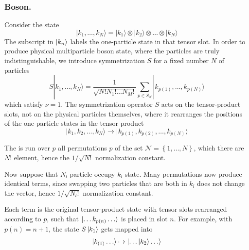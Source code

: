 \documentclass[../../../main.tex]{subfiles}
\begin{document}
\subsubsection{Boson.}
Consider the state
\begin{equation*}
  |k_1, \ldots, k_N\rangle = |k_1\rangle \otimes |k_2\rangle \otimes \ldots \otimes |k_N\rangle
\end{equation*}
The subscript in $\ket{k_n}$ labels the one-particle state in that tensor slot.
In order to produce physical multiparticle boson state, where the particles are truly indistinguishable, we introduce symmetrization $S$ for a fixed number $N$ of particles
\begin{equation*}
  S |k_1, \ldots, k_N \rangle =
  \frac{1}{\sqrt{N!N_1! \ldots N_M!}}
  \sum_{p \in S_N} |k_{p(1)}, \ldots, k_{p(N)} \rangle
\end{equation*}
which satisfy $\nu=1$.
The symmetrization operator  $S$ acts on the tensor-product slots, not on the physical particles themselves, where it rearranges the positions of the one-particle states in the tensor product
\begin{equation*}
  |k_1, k_2, \ldots, k_N\rangle \rightarrow |k_{p(1)}, k_{p(2)}, \ldots, k_{p(N)}\rangle
\end{equation*}

The is run over $p$ all permutations $p$ of the set $\mathcal{N}=\left\{ 1,\dots,N \right\} $, which there are $N!$ element, hence the $1/\sqrt{N!}$ normalization constant.

Now suppose that $N_l$ particle occupy $k_l$ state.
Many permutations now produce identical terms, since swapping two particles that are both in $k_l$  does not change the vector, hence $1/\sqrt{N_l!}$ normalization constant.

Each term is the original tensor-product state with tensor slots rearranged according to $p$, such that $\ket{\dots k_{p(n)}\dots}$ is placed in slot $n$.
For example, with $p(n)=n+1$, the state $S\ket{k_1}$ gets mapped into
\begin{equation*}
  \ket{k_{{(1)}}\dots} \mapsto \ket{\dots \ket{k_2}\dots}
\end{equation*}
\end{document}
